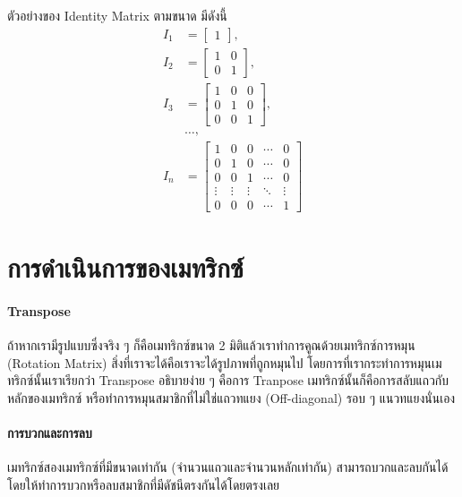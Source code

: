 \noindent ตัวอย่างของ Identity Matrix ตามขนาด มีดังนี้
%
\begin{align}
    I_1 &= \begin{bmatrix} 1 \end{bmatrix}
    ,\ \\
    I_2 &= \begin{bmatrix}
    1 & 0 \\
    0 & 1 \end{bmatrix}
    ,\ \\
    I_3 &= \begin{bmatrix}
    1 & 0 & 0 \\
    0 & 1 & 0 \\
    0 & 0 & 1 \end{bmatrix}
    ,\ \\ 
    & \dots ,\ \nonumber \\
    I_n &= \begin{bmatrix}
    1 & 0 & 0 & \cdots & 0 \\
    0 & 1 & 0 & \cdots & 0 \\
    0 & 0 & 1 & \cdots & 0 \\
    \vdots & \vdots & \vdots & \ddots & \vdots \\
    0 & 0 & 0 & \cdots & 1 \end{bmatrix}
\end{align}

\section{การดำเนินการของเมทริกซ์}
\label{sec:matrix_operate}

\paragraph{Transpose} ถ้าหากเรามีรูปแบบซึ่งจริง ๆ ก็คือเมทริกซ์ขนาด 2 มิติแล้วเราทำการคูณด้วยเมทริกซ์การหมุน (Rotation Matrix) สิ่งที่เราจะได้คือเราจะได้รูปภาพที่ถูกหมุนไป โดยการที่เรากระทำการหมุนเมทริกซ์นั้นเราเรียกว่า Transpose อธิบายง่าย ๆ คือการ Tranpose เมทริกซ์นั้นก็คือการสลับแถวกับหลักของเมทริกซ์ หรือทำการหมุนสมาชิกที่ไม่ใช่แถวทแยง (Off-diagonal) รอบ ๆ แนวทแยงนั่นเอง
%
\paragraph{การบวกและการลบ} เมทริกซ์สองเมทริกซ์ที่มีขนาดเท่ากัน (จำนวนแถวและจำนวนหลักเท่ากัน) สามารถบวกและลบกันได้ โดยให้ทำการบวกหรือลบสมาชิกที่มีดัชนีตรงกันได้โดยตรงเลย
%
